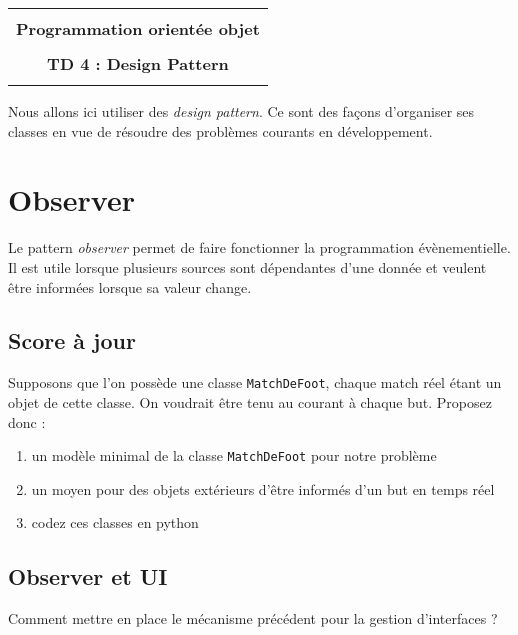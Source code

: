 \documentclass[12pt]{article}
\begin{document}
    \begin{center}
      \begin{tabular}{c}
      \hline
    \\
        {\bf \textsf {\Large Programmation orientée objet}}\\
    \\
        {\bf \textsf {\Large TD 4 : Design Pattern}}\\
    \\
        \hline
      \end{tabular}
    \end{center}
    \vspace{15mm}



Nous allons ici utiliser des {\em design pattern}. Ce sont des façons d'organiser ses classes en vue de résoudre des problèmes courants en développement.

\section{Observer}

Le pattern {\em observer} permet de faire fonctionner la programmation évènementielle. Il est utile lorsque plusieurs sources sont dépendantes d'une donnée et veulent être informées lorsque sa valeur change. 

\subsection{Score à jour}

Supposons que l'on possède une classe \texttt{MatchDeFoot}, chaque match réel étant un objet de cette classe. On voudrait être tenu au courant à chaque but. 
Proposez donc : 
\begin{enumerate}
    \item un modèle minimal de la classe \texttt{MatchDeFoot} pour notre problème
    \item un moyen pour des objets extérieurs d'être informés d'un but en temps réel
    \item codez ces classes en python
\end{enumerate}


\subsection{Observer et UI}

Comment mettre en place le mécanisme précédent pour la gestion d'interfaces ?
\end{document}
